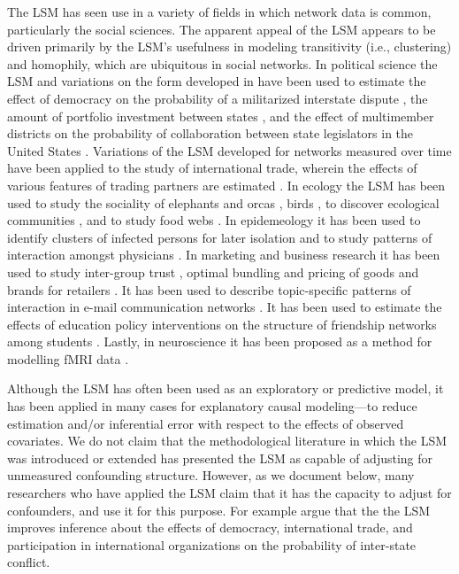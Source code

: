 \documentclass[11pt]{article}
\begin{document}
The LSM has seen use in a variety of fields in which network data is
common, particularly the social sciences. The apparent appeal of the
LSM appears to be driven primarily by the LSM's usefulness in modeling
transitivity (i.e., clustering) and homophily, which are ubiquitous in
social networks. In political science the LSM and variations on the
form developed in \cite{hoff2002latent} have been used to estimate the
effect of democracy on the probability of a militarized interstate
dispute \citep{ward2007disputes}, the amount of portfolio investment
between states \citep{cao2013democracies}, and the effect of
multimember districts on the probability of collaboration between
state legislators in the United States
\citep{kirkland2012multimember}. Variations of the LSM developed for
networks measured over time have been applied to the study of
international trade, wherein the effects of various features of
trading partners are estimated \citep{ward2013gravity}. In ecology the
LSM has been used to study the sociality of elephants
\citep{vance2009social} and orcas \citep{fearnbach2014spatial}, birds
\citep{nomano2015unrelated}, to discover ecological communities
\citep{fletcher2011social, fletcher2013network}, and to study food
webs \citep{chiu2011unifying}. In epidemeology it has been used to
identify clusters of infected persons for later isolation
\citep{zhang2015cluster} and to study patterns of interaction amongst
physicians \citep{paul2014results}. In marketing and business research
it has been used to study inter-group trust \citep{dass2011impact},
optimal bundling and pricing of goods and brands for retailers
\citep{dass2012assessing}. It has been used to describe topic-specific
patterns of interaction in e-mail communication networks
\citep{krafft2012topic}.  It has been used to estimate the effects of
education policy interventions on the structure of friendship networks
among students \citep{sweet2011modeling}. Lastly, in neuroscience it
has been proposed as a method for modelling fMRI data
\citep{simpson2013analyzing}.


Although the LSM has often been used as an exploratory or predictive
model, it has been applied in many cases for explanatory causal
modeling---to reduce estimation and/or inferential error with respect
to the effects of observed covariates. We do not claim that the
methodological literature in which the LSM was introduced or extended
has presented the LSM as capable of adjusting for unmeasured
confounding structure. However, as we document below, many researchers
who have applied the LSM claim that it has the capacity to adjust for
confounders, and use it for this purpose. For example
\citet{ward2007disputes} argue that the
the LSM improves inference about the effects of democracy,
international trade, and participation in international organizations
on the probability of inter-state conflict.
\end{document}
